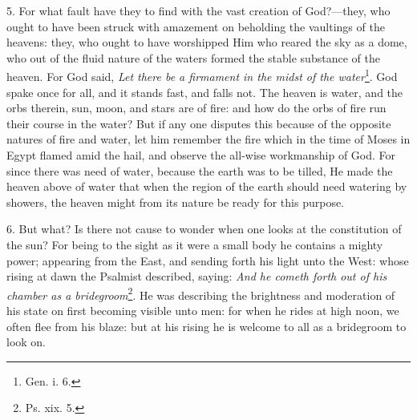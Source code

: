5. For what fault have they to find with the vast creation of God?—they, who ought to have been struck with amazement on beholding the vaultings of the heavens: they, who ought to have worshipped Him who reared the sky as a dome, who out of the fluid nature of the waters formed the stable substance of the heaven. For God said, \emph{Let there be a firmament in the midst of the water}\footnote{Gen. i. 6.}. God spake once for all, and it stands fast, and falls not. The heaven is water, and the orbs therein, sun, moon, and stars are of fire: and how do the orbs of fire run their course in the water? But if any one disputes this because of the opposite natures of fire and water, let him remember the fire which in the time of Moses in Egypt flamed amid the hail, and observe the all-wise workmanship of God. For since there was need of water, because the earth was to be tilled, He made the heaven above of water that when the region of the earth should need watering by showers, the heaven might from its nature be ready for this purpose.

6. But what? Is there not cause to wonder when one looks at the constitution of the sun? For being to the sight as it were a small body he contains a mighty power; appearing from the East, and sending forth his light unto the West: whose rising at dawn the Psalmist described, saying: \emph{And he cometh forth out of his chamber as a bridegroom}\footnote{Ps. xix. 5.}. He was describing the brightness and moderation of his state on first becoming visible unto men: for when he rides at high noon, we often flee from his blaze: but at his rising he is welcome to all as a bridegroom to look on.

